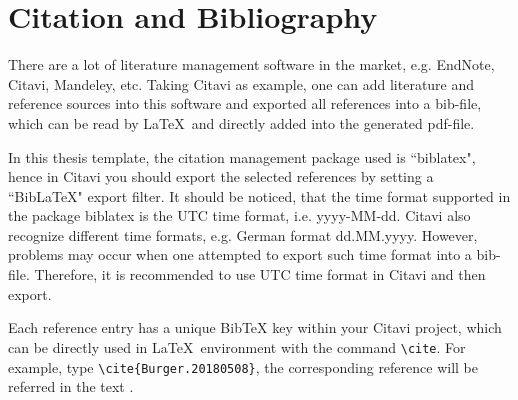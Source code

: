 \chapter{Citation and Bibliography}

There are a lot of literature management software in the market, e.g. EndNote, Citavi, Mandeley, etc. Taking Citavi as example, one can add literature and reference sources into this software and exported all references into a bib-file, which can be read by \LaTeX~and directly added into the generated pdf-file.

In this thesis template, the citation management package used is ``biblatex", hence in Citavi you should export the selected references by setting a ``BibLaTeX" export filter. It should be noticed, that the time format supported in the package biblatex is the UTC time format, i.e. yyyy-MM-dd. Citavi also recognize different time formats, e.g. German format dd.MM.yyyy. However, problems may occur when one attempted to export such time format into a bib-file. Therefore, it is recommended to use UTC time format in Citavi and then export.

Each reference entry has a unique BibTeX key within your Citavi project, which can be directly used in \LaTeX~environment with the command {\verb|\cite|}. For example, type {\verb|\cite{Burger.20180508}|}, the corresponding reference will be referred in the text \cite{Burger.20180508}.

